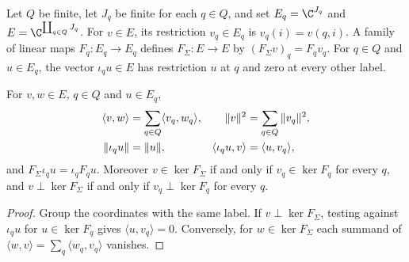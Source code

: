 \begin{definition}
    \label{def:mpo_sigma_fiber_operator}
    \leanok
    Let $Q$ be finite, let $J_q$ be finite for each $q\in Q$, and set
    $E_q=\C^{J_q}$ and $E=\C^{\coprod_{q\in Q}J_q}$. For $v\in E$, its
    restriction $v_q\in E_q$ is $v_q(i)=v(q,i)$. A family of linear maps
    $F_q:E_q\to E_q$ defines $F_\Sigma:E\to E$ by $(F_\Sigma v)_q=F_qv_q$.
    For $q\in Q$ and $u\in E_q$, the vector $\iota_qu\in E$ has restriction
    $u$ at $q$ and zero at every other label.
\end{definition}

\begin{lemma}
    \label{thm:mpo_sigma_fiber_inner_norm}
    \leanok
    For $v,w\in E$, $q\in Q$ and $u\in E_q$,
    \begin{align}
        \langle v,w\rangle       & =\sum_{q\in Q}\langle v_q,w_q\rangle,        &
        \|v\|^2                  & =\sum_{q\in Q}\|v_q\|^2,              \notag   \\
        \|\iota_qu\|             & =\|u\|,                                      &
        \langle\iota_qu,v\rangle & =\langle u,v_q\rangle,             \notag
    \end{align}
    and $F_\Sigma\iota_qu=\iota_qF_qu$. Moreover $v\in\ker F_\Sigma$ if and only
    if $v_q\in\ker F_q$ for every $q$, and $v\perp\ker F_\Sigma$ if and only if
    $v_q\perp\ker F_q$ for every $q$.
\end{lemma}
\begin{proof}
    \leanok
    Group the coordinates with the same label. If $v\perp\ker F_\Sigma$, testing
    against $\iota_qu$ for $u\in\ker F_q$ gives $\langle u,v_q\rangle=0$.
    Conversely, for $w\in\ker F_\Sigma$ each summand of
    $\langle w,v\rangle=\sum_q\langle w_q,v_q\rangle$ vanishes.
\end{proof}


